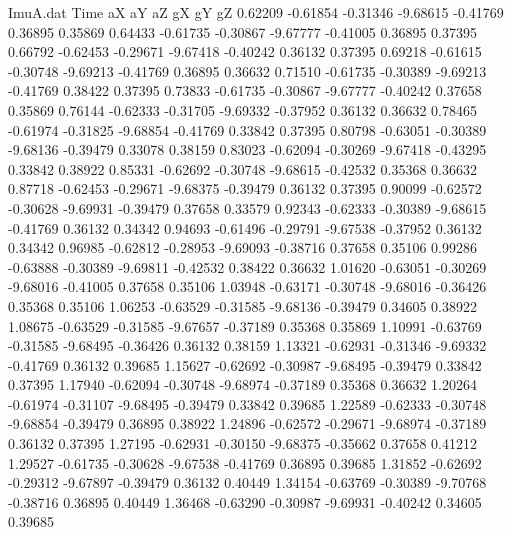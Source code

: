 \begin{filecontents}{ImuA.dat}
Time aX aY aZ gX gY gZ
   0.62209   -0.61854   -0.31346   -9.68615   -0.41769    0.36895    0.35869
   0.64433   -0.61735   -0.30867   -9.67777   -0.41005    0.36895    0.37395
   0.66792   -0.62453   -0.29671   -9.67418   -0.40242    0.36132    0.37395
   0.69218   -0.61615   -0.30748   -9.69213   -0.41769    0.36895    0.36632
   0.71510   -0.61735   -0.30389   -9.69213   -0.41769    0.38422    0.37395
   0.73833   -0.61735   -0.30867   -9.67777   -0.40242    0.37658    0.35869
   0.76144   -0.62333   -0.31705   -9.69332   -0.37952    0.36132    0.36632
   0.78465   -0.61974   -0.31825   -9.68854   -0.41769    0.33842    0.37395
   0.80798   -0.63051   -0.30389   -9.68136   -0.39479    0.33078    0.38159
   0.83023   -0.62094   -0.30269   -9.67418   -0.43295    0.33842    0.38922
   0.85331   -0.62692   -0.30748   -9.68615   -0.42532    0.35368    0.36632
   0.87718   -0.62453   -0.29671   -9.68375   -0.39479    0.36132    0.37395
   0.90099   -0.62572   -0.30628   -9.69931   -0.39479    0.37658    0.33579
   0.92343   -0.62333   -0.30389   -9.68615   -0.41769    0.36132    0.34342
   0.94693   -0.61496   -0.29791   -9.67538   -0.37952    0.36132    0.34342
   0.96985   -0.62812   -0.28953   -9.69093   -0.38716    0.37658    0.35106
   0.99286   -0.63888   -0.30389   -9.69811   -0.42532    0.38422    0.36632
   1.01620   -0.63051   -0.30269   -9.68016   -0.41005    0.37658    0.35106
   1.03948   -0.63171   -0.30748   -9.68016   -0.36426    0.35368    0.35106
   1.06253   -0.63529   -0.31585   -9.68136   -0.39479    0.34605    0.38922
   1.08675   -0.63529   -0.31585   -9.67657   -0.37189    0.35368    0.35869
   1.10991   -0.63769   -0.31585   -9.68495   -0.36426    0.36132    0.38159
   1.13321   -0.62931   -0.31346   -9.69332   -0.41769    0.36132    0.39685
   1.15627   -0.62692   -0.30987   -9.68495   -0.39479    0.33842    0.37395
   1.17940   -0.62094   -0.30748   -9.68974   -0.37189    0.35368    0.36632
   1.20264   -0.61974   -0.31107   -9.68495   -0.39479    0.33842    0.39685
   1.22589   -0.62333   -0.30748   -9.68854   -0.39479    0.36895    0.38922
   1.24896   -0.62572   -0.29671   -9.68974   -0.37189    0.36132    0.37395
   1.27195   -0.62931   -0.30150   -9.68375   -0.35662    0.37658    0.41212
   1.29527   -0.61735   -0.30628   -9.67538   -0.41769    0.36895    0.39685
   1.31852   -0.62692   -0.29312   -9.67897   -0.39479    0.36132    0.40449
   1.34154   -0.63769   -0.30389   -9.70768   -0.38716    0.36895    0.40449
   1.36468   -0.63290   -0.30987   -9.69931   -0.40242    0.34605    0.39685

\end{filecontents}
